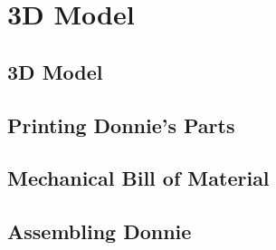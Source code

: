 \chapter{3D Model}

\section{3D Model}
\label{sec:3d_model}

\section{Printing Donnie's Parts}
\label{sec:3d_print}

\section{Mechanical Bill of Material}
\label{sec:mech_bom}

\section{Assembling Donnie}
\label{sec:3d_asm}

